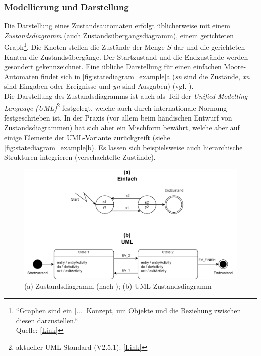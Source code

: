 \documentclass[a4paper, portrait, 12pt]{scrartcl} %
\begin{document}
\subsubsection{Modellierung und Darstellung}

Die Darstellung eines Zustandsautomaten erfolgt üblicherweise mit einem \emph{Zustandsdiagramm} (auch Zustandsübergangsdiagramm), einem gerichteten Graph\footnote{ ``Graphen sind ein [...] Konzept, um Objekte und die Beziehung zwischen diesen darzustellen.``\\Quelle: \href{https://www.tu-chemnitz.de/informatik/theoretische-informatik/TI-1/lecture-notes/06-00-graphs.html}{[Link]}}. Die Knoten stellen die Zustände der Menge $S$ dar und die gerichteten Kanten die Zustandsübergänge. Der Startzustand und die Endzustände werden gesondert gekennzeichnet. Eine übliche Darstellung für einen einfachen Moore-Automaten findet sich in \autoref{fig:statediagram_example}a (\emph{sn} sind die Zustände, \emph{xn} sind Eingaben oder Ereignisse und \emph{yn} sind Ausgaben) (vgl. \cite[S. 9]{Baesig2019}).\\

Die Darstellung des Zustandsdiagramms ist auch als Teil der \emph{Unified Modelling Language (UML)}\footnote{aktueller UML-Standard (V2.5.1): \href{https://www.omg.org/spec/UML/2.5.1/About-UML}{[Link]}} festgelegt, welche auch durch internationale Normung festgeschrieben ist. In der Praxis (vor allem beim händischen Entwurf von Zustandsdiagrammen) hat sich aber ein Mischform bewährt, welche aber auf einige Elemente der UML-Variante zurückgreift (siehe \autoref{fig:statediagram_example}b). Es lassen sich beispielsweise auch hierarchische Strukturen integrieren (verschachtelte Zustände).

\begin{figure}[H]
	\centering
    \includegraphics[scale=0.12]{StateDiagram_example.png} 
	\caption{(a) Zustandsdiagramm (nach \cite{Baesig2019}); (b) UML-Zustandsdiagramm}
	\label{fig:statediagram_example}
\end{figure}
\end{document}
